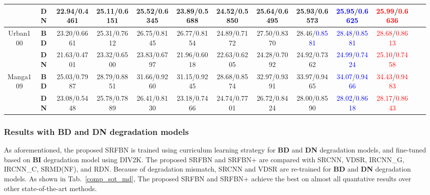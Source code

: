 \documentclass[10pt,twocolumn,letterpaper]{article}
\begin{document}
\begin{table*}[!htbp]
{\begin{tabular}{|c|c|c|c|c|c|c|c|c|c|c|c|c|}
			& \textbf{DN}            & 22.94/0.4461             & 25.11/0.6151 & 25.52/0.6345 & 23.89/0.5688 & 24.52/0.5850 & 25.64/0.6495 & 25.93/0.6573                                      & \textcolor{blue}{25.95}/\textcolor{blue}{0.6625} & \textcolor{red}{25.99}/\textcolor{red}{0.6636}  \\ 
			\hline\hline
			\multirow{2}{*}{Urban100} & \textbf{BD}            & 23.20/0.6661             & 25.31/0.7612 & 26.75/0.8145 & 26.77/0.8154 & 24.89/0.7172 & 27.50/0.8370 & 28.46/\textcolor{blue}{0.8581}                    & \textcolor{blue}{28.48}/\textcolor{blue}{0.8581} & \textcolor{red}{28.68}/\textcolor{red}{0.8613}  \\
			& \textbf{DN}            & 21.63/0.4701             & 23.32/0.6500 & 23.83/0.6797 & 21.96/0.6018 & 22.63/0.6205 & 24.28/0.7092 & 24.92/0.7362                                      & \textcolor{blue}{24.99}/\textcolor{blue}{0.7424} & \textcolor{red}{25.10}/\textcolor{red}{0.7458}  \\ 
			\hline\hline
			\multirow{2}{*}{Manga109} & \textbf{BD}            & 25.03/0.7987             & 28.79/0.8851 & 31.66/0.9260 & 31.15/0.9245 & 28.68/0.8574 & 32.97/0.9391 & 33.97/0.9465                                      & \textcolor{blue}{34.07}/\textcolor{blue}{0.9466} & \textcolor{red}{34.43}/\textcolor{red}{0.9483}  \\
			& \textbf{DN}            & 23.08/0.5448             & 25.78/0.7889 & 26.41/0.8130 & 23.18/0.7466 & 24.74/0.7701 & 26.72/0.8424 & 28.00/0.8590                                      & \textcolor{blue}{28.02}/\textcolor{blue}{0.8618} & \textcolor{red}{28.17}/\textcolor{red}{0.8643}  \\
			\hline
			
	\end{tabular}}
	\smallskip
	\caption{Average PSNR/SSIM values for scale factor  with \textbf{BD} and \textbf{DN} degradation models. The best performance is shown in {\color{red}red} and the second best performance is shown in {\color{blue}blue}.\label{comp_sot_md}}
	
	\end{table*}
	\subsubsection{Results with BD and DN degradation models}
	\label{4.5.3}
	As aforementioned, the proposed SRFBN is trained using curriculum learning strategy for \textbf{BD} and \textbf{DN} degradation models, and fine-tuned based on \textbf{BI} degradation model using DIV2K. The proposed SRFBN and SRFBN+ are compared with SRCNN\cite{dong2016image}, VDSR\cite{Kim_2016_CVPR}, IRCNN\_G\cite{DBLP:conf/cvpr/ZhangZGZ17}, IRCNN\_C\cite{DBLP:conf/cvpr/ZhangZGZ17}, SRMD(NF)\cite{Zhang2017Learning}, and RDN\cite{Zhang_2018_CVPR}. Because of degradation mismatch, SRCNN and VDSR are re-trained for \textbf{BD} and \textbf{DN} degradation models. As shown in Tab.~\ref{comp_sot_md}, The proposed SRFBN and SRFBN+ achieve the best on almost all quantative results over other state-of-the-art methods.
	
\end{document}
